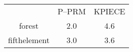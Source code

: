 \documentclass{article}
\begin{document}
\begin{tabular}{c c c}
&P--PRM&KPIECE\\
forest&2.0&4.6\\
fifthelement&3.0&3.6\\
\end{tabular}
\end{document}

